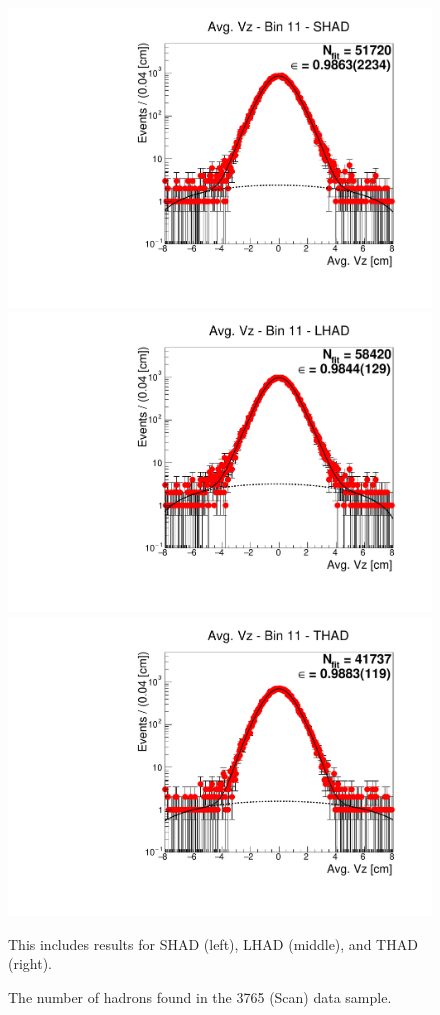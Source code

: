\begin{figure}[H]
\centering
\includegraphics[scale=0.25]{figures/plots/nonDDbar_fit_results/scan/fit_scan_11_data_SHAD.pdf}
\hspace{-0.5cm}
\includegraphics[scale=0.25]{figures/plots/nonDDbar_fit_results/scan/fit_scan_11_data_LHAD.pdf}
\hspace{-0.5cm}
\includegraphics[scale=0.25]{figures/plots/nonDDbar_fit_results/scan/fit_scan_11_data_THAD.pdf}
\caption{The number of hadrons found in the 3765 (Scan) data sample.}
{This includes results for SHAD (left), LHAD (middle), and THAD (right).}
\label{fig:hadron_fits_scan_11}
\end{figure}

